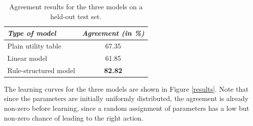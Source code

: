 \begin{table}[ht]
\begin{center}
\begin{tabular}{|l|c|} \hline
\textit{Type of model} & \textit{Agreement (in \%) } \\ \hline \hline
Plain utility table & 67.35 \\ \hline
Linear model & 61.85 \\ \hline
Rule-structured model & \textbf{82.82} \\ \hline
\end{tabular}
\end{center}
\vspace{-2mm}
\caption{Agreement results for the three models on a held-out test set.}
\vspace{-2mm}
\label{table}
\end{table}

The learning curves for the three models are shown in Figure \ref{results}.   Note that since the parameters are initially uniformly distributed, the agreement is already non-zero before learning, since a random assignment of parameters has a low but non-zero chance of leading to the right action. 


